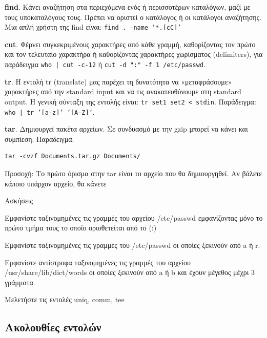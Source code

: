 \begin{packed_item}
	\item \textbf{find}. Κάνει αναζήτηση στα περιεχόμενα ενός ή περισσοτέρων καταλόγων, μαζί με τους υποκαταλόγους τους. Πρέπει να οριστεί ο
	κατάλογος ή οι κατάλογοι αναζήτησης. Μια απλή χρήστη της find είναι: \texttt{find . -name '*.[cC]'}
	\item \textbf{cut}. Φέρνει συγκεκριμένους χαρακτήρες από κάθε γραμμή, καθορίζοντας τον πρώτο και τον τελευταίο χαρακτήρα ή καθορίζοντας
	χαρακτήρες χωρίσματος (delimiters), για παράδειγμα \texttt{who | cut -c-12} ή \texttt{cut -d ":" -f 1 /etc/passwd}.
	\item \textbf{tr}. Η εντολή tr (translate) μας παρέχει τη δυνατότητα να «μεταφράσουμε» χαρακτήρες από την standard input και να τις
	ανακατευθύνουμε στη standard output. Η γενική σύνταξη της εντολής είναι: \texttt{tr set1 set2 < stdin}. Παράδειγμα: \texttt{who | tr
		'[a-z]' '[A-Z]'}.
	\item \textbf{tar}. Δημιουργεί πακέτα αρχείων. Σε συνδυασμό με την gzip μπορεί να κάνει και συμπίεση. Παράδειγμα: 
	\begin{lstlisting}[linewidth=\columnwidth,breaklines=true]
tar -cvzf Documents.tar.gz Documents/
	\end{lstlisting}
	Προσοχή: Το πρώτο όρισμα στην tar είναι το αρχείο που θα δημιουργηθεί. Αν βάλετε κάποιο υπάρχον αρχείο, θα κάνετε \color{red}{override!!!}
\end{packed_item}

\begin{exercisebox}{  Ασκήσεις}
\begin{packed_enum}
	\item Εμφανίστε ταξινομημένες τις γραμμές του αρχείου /etc/passwd εμφανίζοντας μόνο το πρώτο τμήμα τους το οποίο οριοθετείται από το
	(:)
	\item Εμφανίστε ταξινομημένες τις γραμμές του /etc/passwd οι οποίες ξεκινούν από a ή r.
	\item Εμφανίστε αντίστροφα ταξινομημένες τις γραμμές του αρχείου /usr/share/lib/dict/words οι οποίες ξεκινούν από a ή b και έχουν μέγεθος
	μέχρι 3 γράμματα. 
	\item Μελετήστε τις εντολές uniq, comm, tee
\end{packed_enum}
\end{exercisebox}

\subsection{Ακολουθίες εντολών} 

